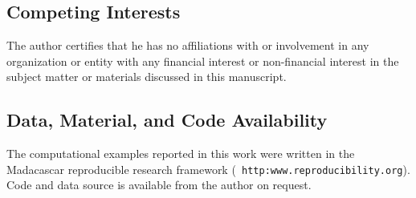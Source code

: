 \documentclass[georeport,12pt]{geophysics}
\begin{document}
\subsection{Competing Interests}
The author certifies that he has no affiliations with or involvement
in any organization or entity with any financial interest or
non-financial interest in the subject matter or materials discussed in
this manuscript.
\subsection{Data, Material, and Code Availability}
The computational examples reported in this work were written in the
Madacascar reproducible research framework ({\tt
  http:www.reproducibility.org}). Code and data source is available
from the author on request.




\end{document}
